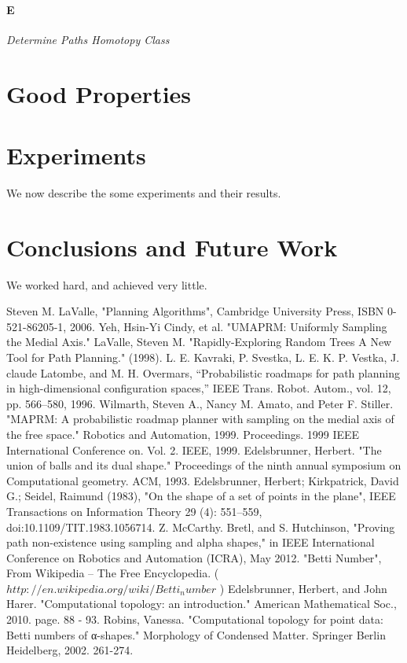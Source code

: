 \documentclass[11pt]{article}
\begin{document}
\paragraph{E} \emph{Determine Paths Homotopy Class} \hfill \\


\section{Good Properties}\label{properties}

\section{Experiments}\label{experiments}
We now describe the some experiments and their results.

\section{Conclusions and Future Work}\label{conclusions}
We worked hard, and achieved very little.


\begin{thebibliography}{1}

   Steven M. LaValle, "Planning Algorithms", Cambridge University Press, ISBN 0-521-86205-1, 2006.
   Yeh, Hsin-Yi Cindy, et al. "UMAPRM: Uniformly Sampling the Medial Axis."
   LaValle, Steven M. "Rapidly-Exploring Random Trees A New Tool for Path Planning." (1998).
   L. E. Kavraki, P. Svestka, L. E. K. P. Vestka, J. claude Latombe, and M. H. Overmars, “Probabilistic roadmaps for path planning in high-dimensional configuration spaces,” IEEE Trans. Robot. Autom., vol. 12, pp. 566–580, 1996.
   Wilmarth, Steven A., Nancy M. Amato, and Peter F. Stiller. "MAPRM: A probabilistic roadmap planner with sampling on the medial axis of the free space." Robotics and Automation, 1999. Proceedings. 1999 IEEE International Conference on. Vol. 2. IEEE, 1999.
   Edelsbrunner, Herbert. "The union of balls and its dual shape." Proceedings of the ninth annual symposium on Computational geometry. ACM, 1993.
   Edelsbrunner, Herbert; Kirkpatrick, David G.; Seidel, Raimund (1983), "On the shape of a set of points in the plane", IEEE Transactions on Information Theory 29 (4): 551–559, doi:10.1109/TIT.1983.1056714.
   Z. McCarthy. Bretl, and S. Hutchinson, "Proving path non-existence using sampling and alpha shapes," in IEEE International Conference on Robotics and Automation (ICRA), May 2012.
   "Betti Number", From Wikipedia -- The Free Encyclopedia. ( $http://en.wikipedia.org/wiki/Betti_number$ )    
  Edelsbrunner, Herbert, and John Harer. "Computational topology: an introduction." American Mathematical Soc., 2010. page. 88 - 93.
   Robins, Vanessa. "Computational topology for point data: Betti numbers of α-shapes." Morphology of Condensed Matter. Springer Berlin Heidelberg, 2002. 261-274.
\end{thebibliography}
\end{document}
